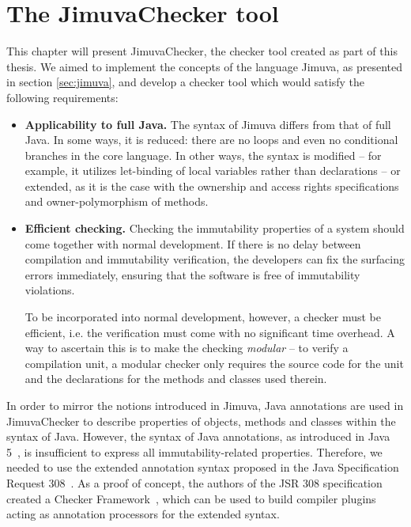 \documentclass{pracamgr}
\theoremstyle{all}
\begin{document}
\chapter{The JimuvaChecker tool}

This chapter will present JimuvaChecker, the checker tool created as
part of this thesis. We aimed to implement the concepts of the
language Jimuva, as presented in section \ref{sec:jimuva}, and develop
a checker tool which would satisfy the following requirements:
\begin{itemize}
\item \textbf{Applicability to full Java.} The syntax of Jimuva
  differs from that of full Java. In some ways, it is reduced: there
  are no loops and even no conditional branches in the core
  language. In other ways, the syntax is modified -- for example, it
  utilizes let-binding of local variables rather than declarations --
  or extended, as it is the case with the ownership and access rights
  specifications and owner-polymorphism of methods.
\item \textbf{Efficient checking.} Checking the immutability
  properties of a system should come together with normal
  development. If there is no delay between compilation and
  immutability verification, the developers can fix the surfacing
  errors immediately, ensuring that the software is free of
  immutability violations.

  To be incorporated into normal development, however, a checker must
  be efficient, i.e. the verification must come with no significant
  time overhead. A way to ascertain this is to make the checking
  \emph{modular} -- to verify a compilation unit, a modular checker
  only requires the source code for the unit and the declarations for
  the methods and classes used therein.
\end{itemize}

In order to mirror the notions introduced in Jimuva, Java annotations
are used in JimuvaChecker to describe properties of objects, methods
and classes within the syntax of Java. However, the syntax of Java
annotations, as introduced in Java 5~\cite{jls3}, is insufficient to
express all immutability-related properties. Therefore, we needed to
use the extended annotation syntax proposed in the Java Specification
Request 308~\cite{jsr308}. As a proof of concept, the authors of the
JSR 308 specification created a Checker Framework~\cite{checkers},
which can be used to build compiler plugins acting as annotation
processors for the extended syntax.
\end{document}
